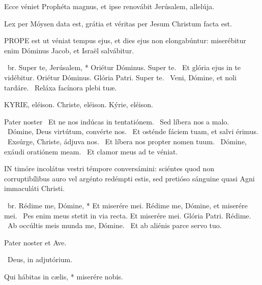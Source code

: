 
  Ecce véniet Prophéta magnus, et ipse renovábit Jerúsalem, allelúja.

  Lex per Móysen data est, grátia et véritas per Jesum Christum facta est.


\lettrine[lines=2]{P}{ROPE} est ut véniat tempus ejus, et dies ejus non elongabúntur: miserébitur enim Dóminus Jacob, et Israël salvábitur.

\R\ br. Super te, Jerúsalem, * Oriétur Dóminus. Super te. \V\ Et glória ejus in te vidébitur. Oriétur Dóminus. Glória Patri. Super te. \V\ Veni, Dómine, et noli tardáre. \R\ Reláxa facínora plebi tuæ.

\label{feria3:precesferialesnona}

KYRIE, eléison. Christe, eléison. Kýrie, eléison.

Pater noster  \V\ Et ne nos indúcas in tentatiónem. \R\ Sed líbera nos a malo. \V\ Dómine, Deus virtútum, convérte nos. \R\ Et osténde fáciem tuam, et salvi érimus. \V\ Exsúrge, Christe, ádjuva nos. \R\ Et líbera nos propter nomen tuum. \V\ Dómine, exáudi oratiónem meam. \R\ Et clamor meus ad te véniat.



\lettrine[lines=2]{I}{N} timóre incolátus vestri témpore conversámini: sciéntes quod non corruptibílibus auro vel argénto redémpti estis, sed pretióso sánguine quasi Agni immaculáti Christi.

\R\ br. Rédime me, Dómine, * Et miserére mei. Rédime me, Dómine, et miserére mei. \V\ Pes enim meus stetit in via recta. Et miserére mei. Glória Patri. Rédime. \V\ Ab occúltis meis munda me, Dómine. \R\ Et ab aliénis parce servo tuo.



\sectionornament


Pater noster et Ave.

\V\ Deus, in adjutórium.

 Qui hábitas in cælis, * miserére nobis.

